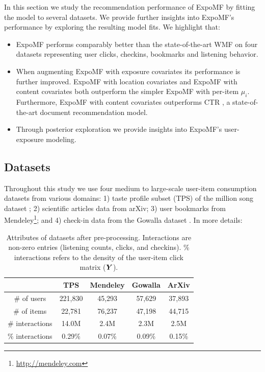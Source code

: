 In this section we study the recommendation performance of ExpoMF by fitting
the model to several datasets. We provide further insights into ExpoMF's
performance by exploring the resulting model fits. We highlight that: 
\begin{itemize} 
\item ExpoMF performs comparably better than the state-of-the-art \gls{WMF}
\cite{hu2008collaborative} on four datasets representing user clicks, checkins,
bookmarks and listening behavior.
\item When augmenting ExpoMF with exposure covariates its performance is
further improved. ExpoMF with location covariates and ExpoMF with content
covariates both outperform the simpler ExpoMF with per-item $\mu_i$.
Furthermore, ExpoMF with content covariates outperforms \gls{CTR} \citep{wang2011collaborative}, a state-of-the-art
document recommendation model.  
\item Through posterior exploration we provide insights into ExpoMF's user-exposure modeling.
\end{itemize} 

\subsection{Datasets}
Throughout this study we use four medium to large-scale user-item consumption datasets from various domains: 
1) taste profile subset (TPS) of the million song dataset \citep{bertin2011million}; 2) scientific articles data from
arXiv; 3) user bookmarks from Mendeley\footnote{\url{http://mendeley.com}}; and 4) check-in
data from the Gowalla dataset \citep{cho2011friendship}. In more details:

\begin{table}
\centering
\begin{tabular}{ c c c c c  }
  \toprule
   & \textbf{TPS} & \textbf{Mendeley} & \textbf{Gowalla} & \textbf{ArXiv} \\
   \midrule
  \# of users & 221,830 & 45,293 & 57,629 & 37,893   \\
  \# of items & 22,781& 76,237 & 47,198 & 44,715 \\
  \# interactions & 14.0M &  2.4M & 2.3M & 2.5M\\
  $\%$ interactions & 0.29\% & 0.07\% & 0.09\% & 0.15\%\\
  \bottomrule 
\end{tabular}
\caption{Attributes of datasets after pre-processing. Interactions are non-zero
entries (listening counts, clicks, and checkins). \% interactions refers to the
density of the user-item click matrix ($\boldsymbol{Y}$).}
\label{chpt:expomf:tab:data}
\end{table}

